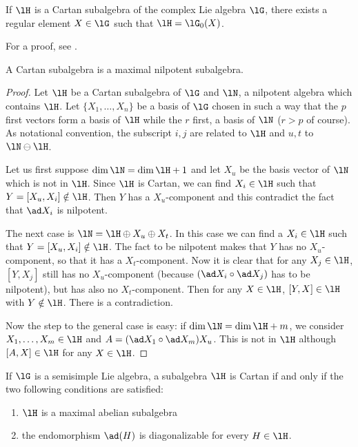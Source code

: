 \begin{proposition}     \label{PropCartanLzXtjs}
	If \( \lH\) is a Cartan subalgebra of the complex Lie algebra \( \lG\), there exists a regular element \( X\in\lG\) such that \( \lH=\lG_0(X)\).
\end{proposition}

For a proof, see \cite{SerreSSAlgebres}.

\begin{proposition}\label{prop:Cartan_max_nil}
	A Cartan subalgebra is a maximal nilpotent subalgebra.
\end{proposition}

\begin{proof}
	Let $\lH$ be a Cartan subalgebra of $\lG$ and $\lN$, a nilpotent algebra which contains $\lH$. Let $\{X_1,\ldots,X_n\}$ be a basis of $\lG$ chosen in such a way that the $p$ first vectors form a basis of $\lH$ while the $r$ first, a basis of $\lN$ ($r>p$ of course). As notational convention, the subscript $i,j$ are related to $\lH$ and $u,t$ to $\lN\ominus\lH$.

	Let us first suppose $\dim\lN=\dim\lH+1$ and let $X_u$ be the basis vector of $\lN$ which is not in $\lH$. Since $\lH$ is Cartan, we can find $X_i\in\lH$ such that $Y=[X_u,X_i]\notin\lH$. Then $Y$ has a $X_u$-component and this contradict the fact that $\ad X_i$ is nilpotent.

	The next case is $\lN=\lH\oplus X_u\oplus X_t$. In this case we can find a $X_i\in\lH$ such that $Y=[X_u,X_i]\notin\lH$. The fact to be nilpotent makes that $Y$ has no $X_u$-component, so that it has a $X_t$-component. Now it is clear that for any $X_j\in\lH$, $[Y,X_j]$ still has no $X_u$-component (because $(\ad X_i\circ\ad X_j)$ has to be nilpotent), but has also no $X_t$-component. Then for any $X\in\lH$, $[Y,X]\in\lH$ with $Y\notin\lH$. There is a contradiction.

	Now the step to the general case is easy: if $\dim\lN=\dim\lH+m$, we  consider $X_1,\ldots,X_m\in\lH$ and $A=(\ad X_1\circ\ad X_m)X_u$. This is not in $\lH$ although $[A,X]\in\lH$ for any $X\in\lH$.
\end{proof}


\begin{proposition}
	If \( \lG\) is a semisimple Lie algebra, a subalgebra \( \lH\) is Cartan if and only if the two following conditions are satisfied:
	\begin{enumerate}
		\item
		      \( \lH\) is a maximal abelian subalgebra
		\item
		      the endomorphism \( \ad(H)\) is diagonalizable for every \( H\in\lH\).
	\end{enumerate}
\end{proposition}

